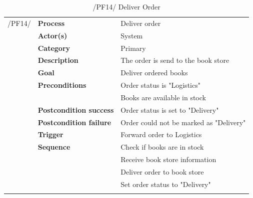 \documentclass[11pt,a4paper,oneside,svgnames]{report}
\begin{document}
\begin{table}[H]
\centering
\begin{tabular}{p{1.5cm}p{3cm}p{8cm}}
\cellcolor{white}/PF14/	& \textbf{Process} & Deliver order\\
\cellcolor{white}		& \textbf{Actor(s)} & System\\
\cellcolor{white}		& \textbf{Category} & Primary\\
\cellcolor{white}		& \textbf{Description}	 &  The order is send to the book store\\
\cellcolor{white}		& \textbf{Goal} & Deliver ordered books\\
\cellcolor{white}		& \textbf{Preconditions} & Order status is "Logistics"\\
\cellcolor{white}		& & Books are available in stock\\
\cellcolor{white}		& \textbf{Postcondition success} & Order status is set to "Delivery"\\
\cellcolor{white}		& \textbf{Postcondition failure} & Order could not be marked as "Delivery"\\
\cellcolor{white}		& \textbf{Trigger} & Forward order to Logistics\\
\cellcolor{white}		& \textbf{Sequence} & Check if books are in stock\\
\cellcolor{white}		& & Receive book store information\\
\cellcolor{white}		& & Deliver order to book store\\
\cellcolor{white}		& & Set order status to "Delivery"\\
\cellcolor{white}\hfill \\
\end{tabular}
\caption{/PF14/ Deliver Order}
\label{tab:pf14}
\end{table}
\end{document}
